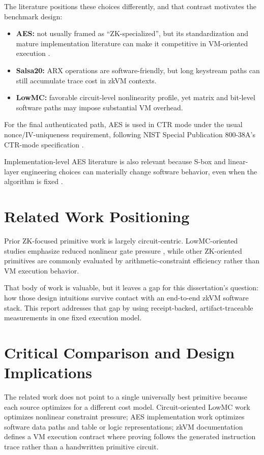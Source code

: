The literature positions these choices differently, and that contrast motivates
the benchmark design:

\begin{itemize}
\item \textbf{AES:} not usually framed as ``ZK-specialized'', but its
standardization and mature implementation literature can make it competitive in
VM-oriented execution \cite{nistfips197,daemen2002rijndael}.
\item \textbf{Salsa20:} ARX operations are software-friendly, but long keystream
paths can still accumulate trace cost in zkVM contexts.
\item \textbf{LowMC:} favorable circuit-level nonlinearity profile, yet matrix
and bit-level software paths may impose substantial VM overhead.
\end{itemize}

For the final authenticated path, AES is used in CTR mode under the usual
nonce/IV-uniqueness requirement, following NIST Special Publication 800-38A's
CTR-mode specification \cite{nistsp80038a}.

Implementation-level AES literature is also relevant because S-box and
linear-layer engineering choices can materially change software behavior, even
when the algorithm is fixed \cite{canright2005compactsbox,boyar2010logicmin}.

\section{Related Work Positioning}

Prior ZK-focused primitive work is largely circuit-centric. LowMC-oriented
studies emphasize reduced nonlinear gate pressure
\cite{albrecht2015ciphers,jaques2019grover}, while other ZK-oriented primitives
are commonly evaluated by arithmetic-constraint efficiency rather than VM
execution behavior.

That body of work is valuable, but it leaves a gap for this dissertation's
question: how those design intuitions survive contact with an end-to-end zkVM
software stack. This report addresses that gap by using receipt-backed,
artifact-traceable measurements in one fixed execution model.

\section{Critical Comparison and Design Implications}

The related work does not point to a single universally best primitive because
each source optimizes for a different cost model. Circuit-oriented LowMC work
optimizes nonlinear constraint pressure; AES implementation work optimizes
software data paths and table or logic representations; zkVM documentation
defines a VM execution contract where proving follows the generated instruction
trace rather than a handwritten primitive circuit.

